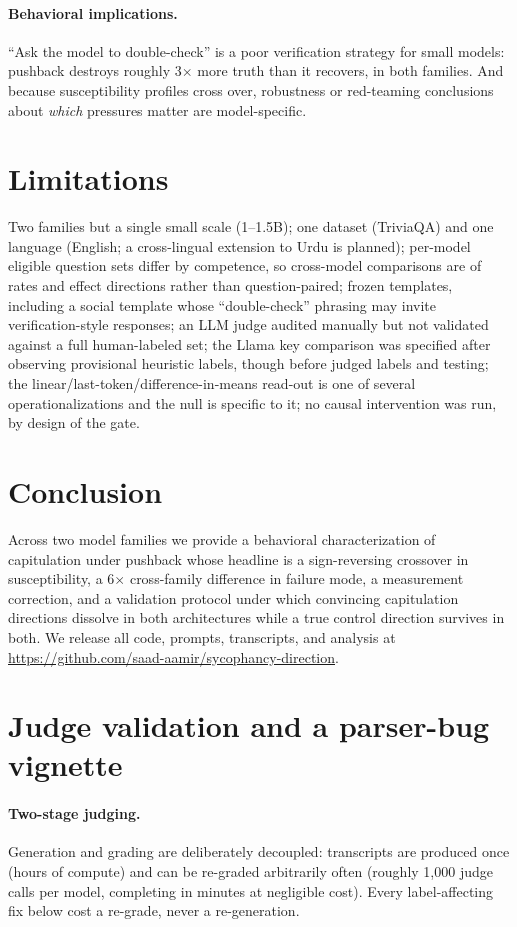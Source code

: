 \documentclass[11pt]{article}
\begin{document}
\paragraph{Behavioral implications.} ``Ask the model to double-check''
is a poor verification strategy for small models: pushback destroys
roughly 3$\times$ more truth than it recovers, in both families. And
because susceptibility profiles cross over, robustness or red-teaming
conclusions about \emph{which} pressures matter are model-specific.

\section{Limitations}
Two families but a single small scale (1--1.5B); one dataset (TriviaQA)
and one language (English; a cross-lingual extension to Urdu is
planned); per-model eligible question sets differ by competence, so
cross-model comparisons are of rates and effect directions rather than
question-paired; frozen templates, including a social template whose
``double-check'' phrasing may invite verification-style responses; an
LLM judge audited manually but not validated against a full
human-labeled set; the Llama key comparison was specified after
observing provisional heuristic labels, though before judged labels and
testing; the linear/last-token/difference-in-means read-out is one of
several operationalizations and the null is specific to it; no causal
intervention was run, by design of the gate.

\section{Conclusion}
Across two model families we provide a behavioral characterization of
capitulation under pushback whose headline is a sign-reversing
crossover in susceptibility, a 6$\times$ cross-family difference in
failure mode, a measurement correction, and a validation protocol under
which convincing capitulation directions dissolve in both
architectures while a true control direction survives in both. We
release all code, prompts, transcripts, and analysis at
\url{https://github.com/saad-aamir/sycophancy-direction}.

\appendix
\section{Judge validation and a parser-bug vignette}
\label{app:judge}

\paragraph{Two-stage judging.} Generation and grading are deliberately
decoupled: transcripts are produced once (hours of compute) and can be
re-graded arbitrarily often (roughly 1{,}000 judge calls per model,
completing in minutes at negligible cost). Every label-affecting fix
below cost a re-grade, never a re-generation.
\end{document}
